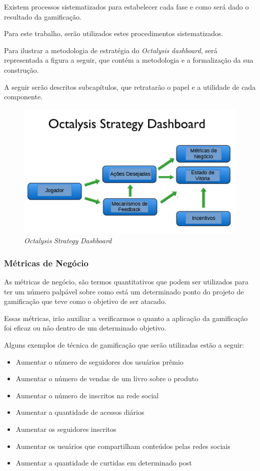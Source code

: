 Existem processos sistematizados para estabelecer cada fase e como será dado o
resultado da gamificação.

Para este trabalho, serão utilizados estes procedimentos sistematizados.

Para ilustrar a metodologia de estratégia do \textit{Octalysis} \textit{dashboard}, será representada
a figura a seguir, que contém a metodologia e a formalização da sua construção.

A seguir serão descritos subcapítulos, que retratarão o papel e a utilidade de
cada
componente.


 \begin{figure}[h]
     \centering

     \includegraphics[width=450px, scale=1]{figuras/dashboard}
     \caption{\textit{Octalysis} \textit{Strategy} \textit{Dashboard}}

     \label{fig:dashboard}
 \end{figure}

\subsubsection{Métricas de Negócio}
\label{sub:business_metrics}
As métricas de negócio, são termos quantitativos que podem ser utilizados
para ter um número palpável sobre como está um determinado ponto do projeto de gamificação
que teve como o objetivo de ser atacado.

Essas métricas, irão auxiliar a verificarmos o quanto a aplicação da gamificação
 foi eficaz ou
não dentro de um determinado objetivo.

Alguns exemplos de técnica de gamificação que serão utilizadas estão a seguir:

\begin{itemize}
    \item Aumentar o número de seguidores dos usuários prêmio
    \item Aumentar o número de vendas de um livro sobre o produto
    \item Aumentar o número de inscritos na rede social
    \item Aumentar a quantidade de acessos diários
    \item Aumentar os seguidores inscritos
    \item Aumentar os usuários que compartilham conteúdos pelas redes sociais
    \item Aumentar a quantidade de curtidas em determinado post
\end{itemize}

